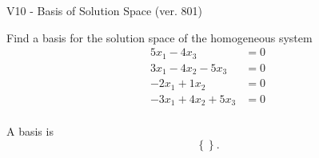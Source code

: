 \begin{exercise}
  \begin{exerciseTitle}V10 - Basis of Solution Space (ver. 801)\end{exerciseTitle}
  \begin{exerciseStatement}
    Find a basis for the solution space of the homogeneous system 
\begin{align*}
 5 x_ 1 -4 x_ 3 &= 0  \\ 
  3 x_ 1 -4 x_ 2 -5 x_ 3 &= 0  \\ 
  -2 x_ 1 + 1 x_ 2 &= 0  \\ 
  -3 x_ 1 + 4 x_ 2 + 5 x_ 3 &= 0  \\ 
 \end{align*}


 
  \end{exerciseStatement}

  \begin{exerciseAnswer}
   A basis is   
\[\left\{\right\}.\]

  


  \end{exerciseAnswer}
\end{exercise}
